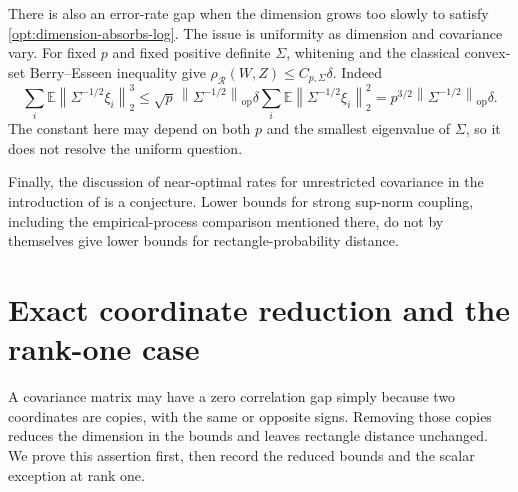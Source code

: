 \documentclass[11pt,a4paper]{article}
\theoremstyle{remark}
\newcommand{\E}{\mathbb E}
\newcommand{\op}{\mathrm{op}}
\newcommand{\norm}[1]{\left\lVert#1\right\rVert}
\newcommand{\rh}{\rho_{\mathcal R}}
\begin{document}
There is also an error-rate gap when the dimension grows too slowly
to satisfy \eqref{opt:dimension-absorbs-log}. The issue is uniformity
as dimension and covariance vary. For fixed \(p\) and fixed positive
definite \(\Sigma\), whitening and the classical convex-set
Berry--Esseen inequality give
\(\rh(W,Z)\le C_{p,\Sigma}\delta\). Indeed
\[
 \sum_i\E\norm{\Sigma^{-1/2}\xi_i}_2^3
 \le \sqrt p\,\norm{\Sigma^{-1/2}}_{\op}\delta
       \sum_i\E\norm{\Sigma^{-1/2}\xi_i}_2^2
 =p^{3/2}\norm{\Sigma^{-1/2}}_{\op}\delta.
\]
The constant here may depend on both \(p\) and the smallest
eigenvalue of \(\Sigma\), so it does not resolve the uniform question.

Finally, the discussion of near-optimal rates for unrestricted covariance
in the introduction of \cite{CCK} is a conjecture. Lower bounds for
strong sup-norm coupling, including the empirical-process comparison
mentioned there, do not by themselves give lower bounds for
rectangle-probability distance.


\section{Exact coordinate reduction and the rank-one case}
\label{sec:coordinate-reduction}

A covariance matrix may have a zero correlation gap simply because two
coordinates are copies, with the same or opposite signs. Removing those
copies reduces the dimension in the bounds and leaves rectangle distance
unchanged. We prove this assertion first, then record the reduced bounds
and the scalar exception at rank one.
\end{document}
